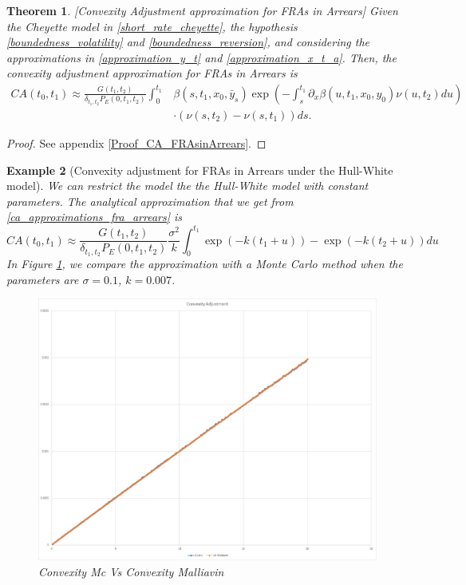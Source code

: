 \documentclass[a4paper,10pt]{article}
\newtheorem{theorem}{Theorem}[section]
\newtheorem{example}[theorem]{Example}
\newcommand{\1}{\mathbf{1}}
\begin{document}
\begin{theorem}\label{Th_CA_FRAsinArrears}[Convexity Adjustment approximation for FRAs in Arrears]
Given the Cheyette model in \eqref{short_rate_cheyette}, the hypothesis \ref{boundedness_volatility} and \ref{boundedness_reversion}, and considering the approximations in \eqref{approximation_y_t} and \eqref{approximation_x_t_a}. Then, the convexity adjustment approximation for FRAs in Arrears is 
\begin{align}\label{ca_approximations_fra_arrears}
CA(t_0,t_1) \approx  \frac{G(t_1,t_2)}{\delta_{t_1,t_2}P_{E}(0,t_1,t_2)} \int_{0}^{t_1}& \beta(s,t_1, x_0, \bar{y}_s) \exp\left(-\int_{s}^{t_1} \partial_x \beta(u,t_1,x_0,y_0) \nu(u,t_2) du \right) \nonumber\\
\qquad\qquad &\cdot \left(\nu(s,t_2) - \nu(s,t_1)\right) ds.
\end{align}
\end{theorem}
\begin{proof}
See appendix \ref{Proof_CA_FRAsinArrears}.
\end{proof}


\begin{example}[Convexity adjustment for FRAs in Arrears under the Hull-White model]\label{example_convexity_hw_FRAsinArrears}
We can restrict the model the the Hull-White model with constant parameters. The analytical approximation that we get from \eqref{ca_approximations_fra_arrears} is
\begin{equation*}
CA(t_0,t_1) \approx \frac{G(t_1,t_2)}{\delta_{t_1,t_2}P_{E}(0,t_1,t_2)}  \frac{\sigma^{2}}{k} \int_{0}^{t_1} \exp(- k(t_1 + u)) -   \exp(- k(t_2 + u)) du 
\end{equation*}
In Figure \ref{fig:FRA_HW}, we compare the approximation with a Monte Carlo method when the parameters are $\sigma=0.1$, $k=0.007$.
\begin{figure}[H]
		\begin{center}
		\includegraphics[scale=0.3]{Figures/fra_convexity.jpg}
		\end{center}
		\caption{Convexity Mc Vs Convexity Malliavin}
		\label{fig:FRA_HW}
\end{figure}
\end{example}
\end{document}
